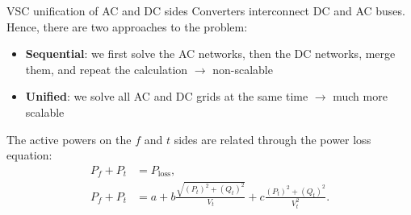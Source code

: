 \begin{frame}{VSC unification of AC and DC sides}
    Converters interconnect DC and AC buses. Hence, there are two approaches to the problem:
    \begin{itemize}
        \item \textbf{Sequential}: we first solve the AC networks, then the DC networks, merge them, and repeat the calculation $\rightarrow$ non-scalable
        \item \textbf{Unified}: we solve all AC and DC grids at the same time $\rightarrow$ much more scalable
    \end{itemize}

    The active powers on the $f$ and $t$ sides are related through the power loss equation:
    \begin{equation}
    \begin{aligned}
        P_f + P_t &= P_{\text{loss}}, \\
        P_f + P_t &= a + b \frac{\sqrt{(P_t)^2 + (Q_t)^2}}{V_t} + c \frac{(P_t)^2 + (Q_t)^2}{V_t^2}. \\
    \end{aligned}
    \end{equation}
\end{frame}






